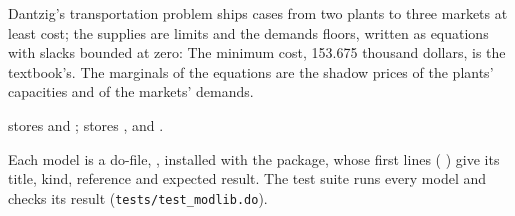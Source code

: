 
Dantzig's transportation problem ships cases from two plants to three
markets at least cost; the supplies are limits and the demands floors,
written as equations with slacks bounded at zero:
The minimum cost, 153.675 thousand dollars, is the textbook's. The marginals
of the equations are the shadow prices of the plants' capacities and of the
markets' demands.


 stores  and ;
 stores ,  and
.


Each model is a do-file, , installed with the
package, whose first lines (\cmd{*!} \cmd{:} ) give its
title, kind, reference and expected result. The test suite runs every model
and checks its result (\texttt{tests/test\_modlib.do}).


\begin{alsosee}
\end{alsosee}
